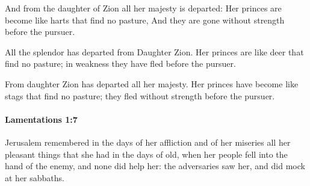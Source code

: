 			\begin{versebox}
					\item[BHS] 
					\item[LXX] 
					\item[ASV] And from the daughter of Zion all her majesty is departed: Her princes are become like harts that find no pasture, And they are gone without strength before the pursuer.
					\item[NIV] All the splendor has departed from Daughter Zion. Her princes are like deer that find no pasture; in weakness they have fled before the pursuer.
					\item[NRSV] From daughter Zion has departed all her majesty. Her princes have become like stags that find no pasture; they fled without strength before the pursuer.
			\end{versebox}

		\paragraph{Lamentations 1:7} %
			\label{LAMENTATIONS-1-7}

			Jerusalem remembered in the days of her affliction and of her miseries all her pleasant things that she had in the days of old, when her people fell into the hand of the enemy, and none did help her: the adversaries saw her, and did mock at her sabbaths.

